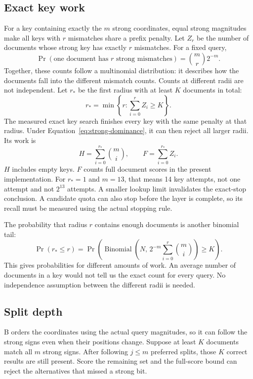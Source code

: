 \subsection{Exact key work}
For a key containing exactly the $m$ strong coordinates, equal strong magnitudes make all keys
with $r$ mismatches share a prefix penalty. Let $Z_r$ be the number of documents whose strong
key has exactly $r$ mismatches. For a fixed query,
\[
\Pr(\text{one document has }r\text{ strong mismatches})=\binom mr2^{-m}.
\]
Together, these counts follow a multinomial distribution: it describes how the documents
fall into the different mismatch counts. Counts at different radii are not independent. Let $r_*$ be the first radius with at least $K$ documents in total:
\[
r_* = \min\left\{r:\sum_{i=0}^{r}Z_i\ge K\right\}.
\]
The measured exact key search finishes every key with the same penalty at that radius. Under
Equation~\eqref{eq:strong-dominance}, it can then reject all larger radii. Its work is
\begin{equation}
H=\sum_{i=0}^{r_*}\binom mi,\qquad F=\sum_{i=0}^{r_*}Z_i.
\label{eq:strong-key-work}
\end{equation}
$H$ includes empty keys. $F$ counts full document scores in the present implementation.
For $r_*=1$ and $m=13$, that means 14 key attempts, not one attempt and not $2^{13}$ attempts.
A smaller lookup limit invalidates the exact-stop conclusion. A candidate quota can also stop
before the layer is complete, so its recall must be measured using the actual stopping rule.

The probability that radius $r$ contains enough documents is another binomial tail:
\[
\Pr(r_*\le r)=\Pr\!\left(\operatorname{Binomial}\!\left(N,\,2^{-m}\sum_{i=0}^{r}\binom mi\right)\ge K\right).
\]
This gives probabilities for different amounts of work. An average number of documents
in a key would not tell us the exact count for every query. No independence assumption between the different radii is needed.

\subsection{Split depth}
B orders the coordinates using the actual query magnitudes, so it can follow the strong signs
even when their positions change. Suppose at least $K$ documents match all $m$ strong signs.
After following $j\le m$ preferred splits, those $K$ correct results are still present. Score the
remaining set and the full-score bound can reject the alternatives that missed a strong bit.

